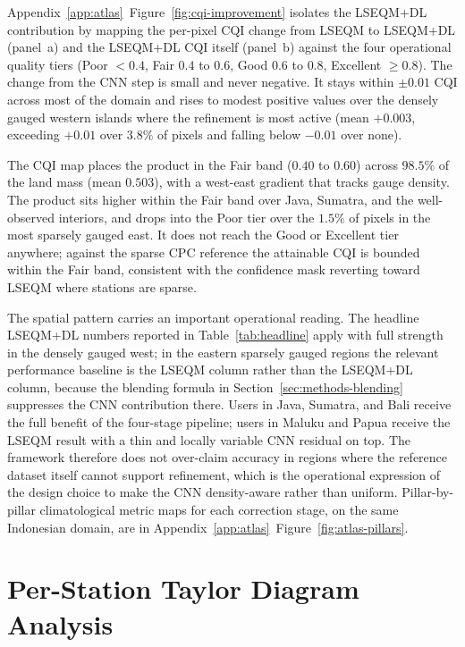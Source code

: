 Appendix~\ref{app:atlas}~Figure~\ref{fig:cqi-improvement} isolates the LSEQM+DL
contribution by mapping the per-pixel CQI change from LSEQM to
LSEQM+DL (panel~a) and the LSEQM+DL CQI itself (panel~b) against
the four operational quality tiers (Poor $<0.4$, Fair $0.4$ to $0.6$,
Good $0.6$ to $0.8$, Excellent $\geq 0.8$). The change from the CNN
step is small and never negative. It stays within $\pm 0.01$ CQI
across most of the domain and rises to modest positive values over
the densely gauged western islands where the refinement is most
active (mean $+0.003$, exceeding $+0.01$ over $3.8\%$ of pixels and
falling below $-0.01$ over none).

The CQI map places the product in
the Fair band ($0.40$ to $0.60$) across $98.5\%$ of the land mass
(mean $0.503$), with a west-east gradient that tracks gauge
density. The product sits higher within the Fair band over Java, Sumatra, and the
well-observed interiors, and drops into the Poor tier over the
$1.5\%$ of pixels in the most sparsely gauged east. It does not
reach the Good or Excellent tier anywhere; against the sparse CPC
reference the attainable CQI is bounded within the Fair band,
consistent with the confidence mask reverting toward LSEQM where
stations are sparse.


The spatial pattern carries an important operational reading.
The headline LSEQM+DL numbers reported in
Table~\ref{tab:headline} apply with full strength in the
densely gauged west; in the eastern sparsely gauged regions the
relevant performance baseline is the LSEQM column rather than
the LSEQM+DL column, because the blending formula in
Section~\ref{sec:methods-blending} suppresses the CNN
contribution there. Users in Java, Sumatra, and Bali receive
the full benefit of the four-stage pipeline; users in Maluku
and Papua receive the LSEQM result with a thin and locally
variable CNN residual on top. The framework therefore does not
over-claim accuracy in regions where the reference dataset
itself cannot support refinement, which is the operational
expression of the design choice to make the CNN density-aware
rather than uniform. Pillar-by-pillar climatological metric maps
for each correction stage, on the same Indonesian domain, are in
Appendix~\ref{app:atlas}~Figure~\ref{fig:atlas-pillars}.


\section{Per-Station Taylor Diagram Analysis}\label{sec:results-taylor}

